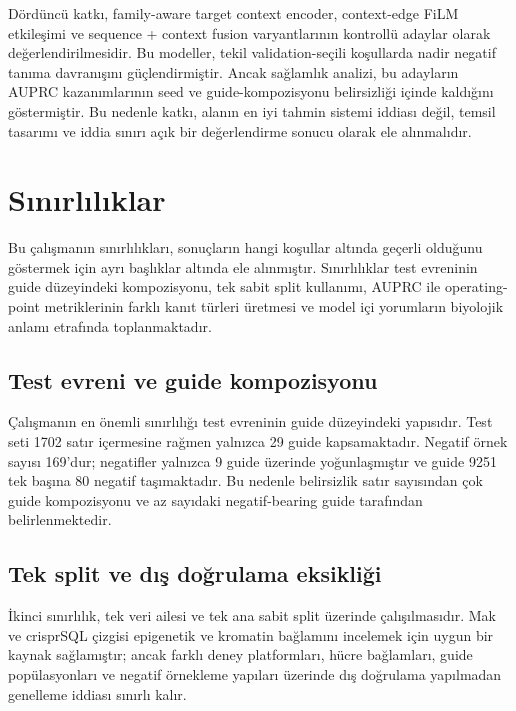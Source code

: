 Dördüncü katkı, family-aware target context encoder, context-edge FiLM etkileşimi ve sequence + context fusion varyantlarının kontrollü adaylar olarak değerlendirilmesidir. Bu modeller, tekil validation-seçili koşullarda nadir negatif tanıma davranışını güçlendirmiştir. Ancak sağlamlık analizi, bu adayların AUPRC kazanımlarının seed ve guide-kompozisyonu belirsizliği içinde kaldığını göstermiştir. Bu nedenle katkı, alanın en iyi tahmin sistemi iddiası değil, temsil tasarımı ve iddia sınırı açık bir değerlendirme sonucu olarak ele alınmalıdır.

\section{Sınırlılıklar}

Bu çalışmanın sınırlılıkları, sonuçların hangi koşullar altında geçerli olduğunu göstermek için ayrı başlıklar altında ele alınmıştır. Sınırlılıklar test evreninin guide düzeyindeki kompozisyonu, tek sabit split kullanımı, AUPRC ile operating-point metriklerinin farklı kanıt türleri üretmesi ve model içi yorumların biyolojik anlamı etrafında toplanmaktadır.

\subsection{Test evreni ve guide kompozisyonu}

Çalışmanın en önemli sınırlılığı test evreninin guide düzeyindeki yapısıdır. Test seti 1702 satır içermesine rağmen yalnızca 29 guide kapsamaktadır. Negatif örnek sayısı 169'dur; negatifler yalnızca 9 guide üzerinde yoğunlaşmıştır ve guide 9251 tek başına 80 negatif taşımaktadır. Bu nedenle belirsizlik satır sayısından çok guide kompozisyonu ve az sayıdaki negatif-bearing guide tarafından belirlenmektedir.

\subsection{Tek split ve dış doğrulama eksikliği}

İkinci sınırlılık, tek veri ailesi ve tek ana sabit split üzerinde çalışılmasıdır. Mak ve crisprSQL çizgisi epigenetik ve kromatin bağlamını incelemek için uygun bir kaynak sağlamıştır; ancak farklı deney platformları, hücre bağlamları, guide popülasyonları ve negatif örnekleme yapıları üzerinde dış doğrulama yapılmadan genelleme iddiası sınırlı kalır.


